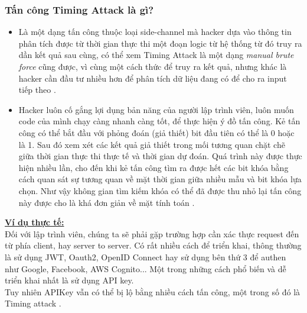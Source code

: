 \subsubsection{Tấn công Timing Attack là gì?}
\begin{itemize}
    \item Là một dạng tấn công thuộc loại side-channel mà hacker dựa vào thông tin phân tích được từ thời gian thực thi một đoạn logic từ hệ thống từ đó truy ra dần kết quả sau cùng, có thể xem Timing Attack là một dạng \textit{manual brute force} cũng được, vì cùng một cách thức để truy ra kết quả, nhưng khác là hacker cần đầu tư nhiều hơn để phân tích dữ liệu đang có để cho ra input tiếp theo \cite{trinh-2023}.
    \item Hacker luôn cố gắng lợi dụng bản năng của người lập trình viên, luôn muốn code của mình chạy càng nhanh càng tốt, để thực hiện ý đồ tấn công. Kẻ tấn công có thể bắt đầu với phỏng đoán (giả thiết) bit đầu tiên có thể là 0 hoặc là 1. Sau đó xem xét các kết quả giả thiết trong mối tương quan chặt chẽ giữa thời gian thực thi thực tế và thời gian dự đoán. Quá trình này được thực hiện nhiều lần, cho đến khi kẻ tấn công tìm ra được hết các bit khóa bằng cách quan sát sự tương quan về mặt thời gian giữa nhiều mẫu và bit khóa lựa chọn. Như vậy không gian tìm kiếm khóa có thể đã được thu nhỏ lại tấn công này được cho là khá đơn giản về mặt tính toán \cite{trinh-2023}.
\end{itemize}
\underline{\textbf{Ví dụ thực tế:}}\\
Đối với lập trình viên, chúng ta sẽ phải gặp trường hợp cần xác thực request đến từ phía client, hay server to server. Có rất nhiều cách để triển khai, thông thường là sử dụng JWT, Oauth2, OpenID Connect hay sử dụng bên thứ 3 để authen như Google, Facebook, AWS Cognito... Một trong những cách phổ biến và dễ triển khai nhất là sử dụng API key.\\
Tuy nhiên APIKey vẫn có thể bị lộ bằng nhiều cách tấn công, một trong số đó là Timing attack \cite{leo-2024}.
